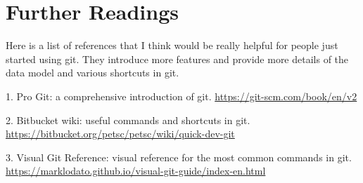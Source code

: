 \documentclass[runningheads,letterpaper]{llncs}
\begin{document}
\section{Further Readings}

Here is a list of references that I think would be really helpful for people just started using git.
They introduce more features and provide more details of the data model and various shortcuts in git.

1. Pro Git: a comprehensive introduction of git. \url{https://git-scm.com/book/en/v2}

2. Bitbucket wiki: useful commands and shortcuts in git. \url{https://bitbucket.org/petsc/petsc/wiki/quick-dev-git}

3. Visual Git Reference: visual reference for the most common commands in git. \url{https://marklodato.github.io/visual-git-guide/index-en.html}
\end{document}
